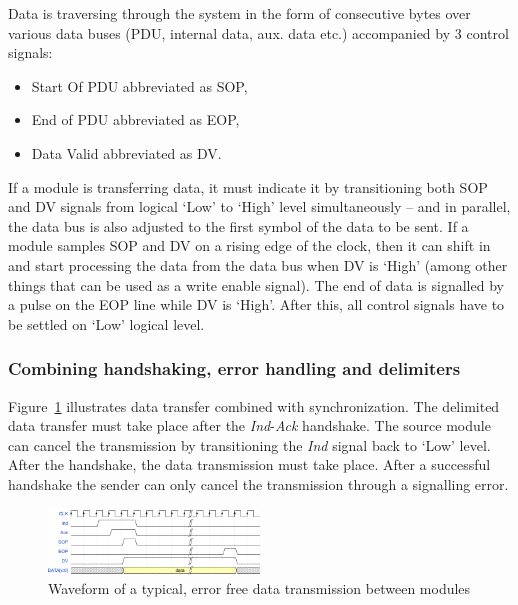 \documentclass[conference]{IEEEtran}
\begin{document}
Data is traversing through the system in the form of consecutive bytes over various data buses (PDU, internal data,
aux. data etc.) accompanied by 3 control signals:
\begin{itemize}
    \renewcommand \labelitemi{--}
    \item Start Of PDU abbreviated as SOP,
    \item End of PDU abbreviated as EOP,
    \item Data Valid abbreviated as DV.
\end{itemize}
If a module is transferring data, it must indicate it by transitioning both SOP and DV signals from logical `Low' to
`High' level simultaneously -- and in parallel, the data bus is also adjusted to the first symbol of the data to be
sent.
If a module samples SOP and DV on a rising edge of the clock, then it can shift in and start processing the data from
the data bus when DV is `High' (among other things that can be used as a write enable signal).
The end of data is signalled by a pulse on the EOP line while DV is `High'. After this, all control signals have to be
settled on `Low' logical level.

\subsubsection{Combining handshaking, error handling and delimiters}

Figure~\ref{fig:data_signals} illustrates data transfer combined with synchronization. The delimited data transfer must
take place after the \emph{Ind}-\emph{Ack} handshake.
The source module can cancel the transmission by transitioning the \emph{Ind} signal back to `Low' level. After the
handshake, the data transmission must take place. After a successful handshake the sender can only cancel the
transmission through a signalling error.

\begin{figure}[!htb]
    \centering
    \includegraphics[width=0.5\textwidth]{figures_raw/data_signals.png}
    \caption{Waveform of a typical, error free data transmission between modules}
    \label{fig:data_signals}
\end{figure}
\end{document}
